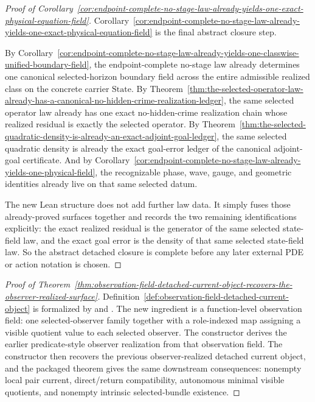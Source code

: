 \begin{proof}[Proof of Corollary~\ref{cor:endpoint-complete-no-stage-law-already-yields-one-exact-physical-equation-field}]
\label{proof:cor:endpoint-complete-no-stage-law-already-yields-one-exact-physical-equation-field}
Corollary~\ref{cor:endpoint-complete-no-stage-law-already-yields-one-exact-physical-equation-field}
is the final abstract closure step.

By Corollary~\ref{cor:endpoint-complete-no-stage-law-already-yields-one-classwise-unified-boundary-field},
the endpoint-complete no-stage law already determines one canonical
selected-horizon boundary field across the entire admissible realized class on
the concrete carrier \(\mathrm{State}\). By
Theorem~\ref{thm:the-selected-operator-law-already-has-a-canonical-no-hidden-crime-realization-ledger},
the same selected operator law already has one exact no-hidden-crime
realization chain whose realized residual is exactly the selected operator. By
Theorem~\ref{thm:the-selected-quadratic-density-is-already-an-exact-adjoint-goal-ledger},
the same selected quadratic density is already the exact goal-error ledger of
the canonical adjoint-goal certificate. And by
Corollary~\ref{cor:endpoint-complete-no-stage-law-already-yields-one-physical-field},
the recognizable phase, wave, gauge, and geometric identities already live on
that same selected datum.

The new Lean structure  does not add
further law data. It simply fuses those already-proved surfaces together and
records the two remaining identifications explicitly: the exact realized
residual is the generator of the same selected state-field law, and the exact
goal error is the density of that same selected state-field law. So the
abstract detached closure is complete before any later external PDE or action
notation is chosen.
\end{proof}

\begin{proof}[Proof of Theorem~\ref{thm:observation-field-detached-current-object-recovers-the-observer-realized-surface}]
\label{proof:thm:observation-field-detached-current-object-recovers-the-observer-realized-surface}
Definition~\ref{def:observation-field-detached-current-object} is formalized by
 and
. The new ingredient is a
function-level observation field: one selected-observer family together with a
role-indexed map assigning a visible quotient value to each selected observer.
The constructor
derives the earlier predicate-style observer realization from that observation
field. The constructor
 then
recovers the previous observer-realized detached current object, and the
packaged theorem  gives the
same downstream consequences: nonempty local pair current, direct/return
compatibility, autonomous minimal visible quotients, and nonempty intrinsic
selected-bundle existence.
\end{proof}

